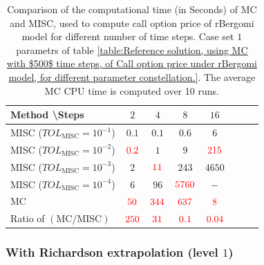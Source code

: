 \begin{table}[h!]
	\centering
	\begin{tabular}{l*{6}{c}r}
		Method \textbackslash  Steps            & $2$ & $4$ & $8$ & $16$ &   \\
		\hline
		MISC ($TOL_{\text{MISC}}=10^{-1}$)  & $0.1$ & $0.1$ & $0.6$ & $6$  \\
		MISC ($TOL_{\text{MISC}}=10^{-2}$)  & ${\color{red}0.2}$ & $1$ & $9$ & ${\color{red}215}$  \\
		MISC ($TOL_{\text{MISC}}=10^{-3}$)  & $2$ & ${\color{red}11}$ & $243$ & $4650$  \\
		MISC ($TOL_{\text{MISC}}=10^{-4}$)  & $6$ & $96$ & ${\color{red}5760}$ & $-$  \\
		\hline
		MC     & ${\color{red} 50}$  & ${\color{red}344}$  & ${\color{red}637}$ & ${\color{red}8}$  \\
		
		\hline
		Ratio of $\left(\text{MC}/ \text{MISC} \right)$  &${\color{red}  250}$ & ${\color{red}    31
		}$  & ${\color{red} 0.1
		}$  & ${\color{red}  0.04}$ \\
		\hline
	\end{tabular}
	\caption{Comparison of the computational time (in Seconds) of  MC and MISC, used to compute call option price of rBergomi model for different number of time steps. Case set $1$ parametrs of table \ref{table:Reference solution, using MC with $500$ time steps, of Call option price under rBergomi model, for different parameter constellation.}. The
		average MC CPU time is computed over 10 runs. }
	\label{Comparison of the computational time of  MC and MISC, used to compute Call option price of rBergomi model for different number of time steps. Case set1}
\end{table}

\FloatBarrier
\subsubsection*{With Richardson extrapolation (level $1$)}







